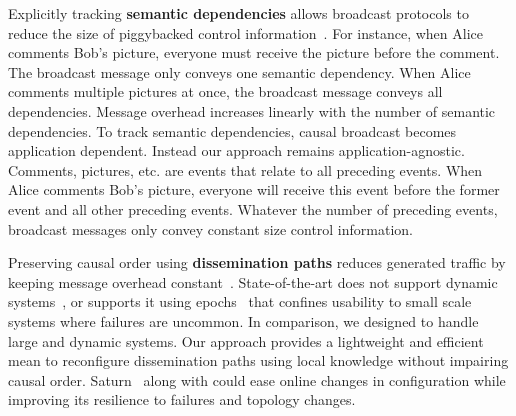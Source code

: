 \noindent Explicitly tracking \textbf{semantic dependencies} allows broadcast
protocols to reduce the size of piggybacked control
information~\cite{bailis2013bolton,lloyd2011cops,mukund2014optimized}. For
instance, when Alice comments Bob's picture, everyone must receive the picture
before the comment. The broadcast message only conveys one semantic
dependency. When Alice comments multiple pictures at once, the broadcast message
conveys all dependencies.  Message overhead increases linearly with the number
of semantic dependencies. To track semantic dependencies, causal broadcast
becomes application dependent. Instead our approach remains
application-agnostic. Comments, pictures, etc. are events that relate to all
preceding events. When Alice comments Bob's picture, everyone will receive this
event before the former event and all other preceding events. Whatever the
number of preceding events, broadcast messages only convey constant size control
information.

\noindent Preserving causal order using \textbf{dissemination paths} reduces
generated traffic by keeping message overhead
constant~\cite{bravo2017saturn,friedman2004causal}. State-of-the-art does not
support dynamic systems~\cite{friedman2004causal}, or supports it using
epochs~\cite{bravo2017saturn} that confines usability to small scale systems
where failures are uncommon. In comparison, we designed \CBROADCAST to handle
large and dynamic systems. Our approach provides a lightweight and efficient
mean to reconfigure dissemination paths using local knowledge without impairing
causal order.  Saturn~\cite{bravo2017saturn} along with \CBROADCAST could ease
online changes in configuration while improving its resilience to failures and topology
changes.




